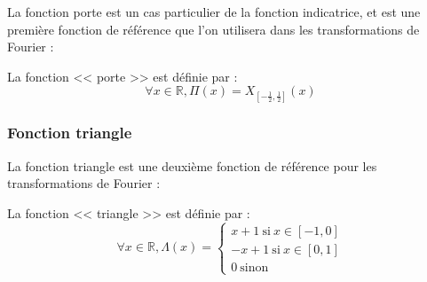 \documentclass[12pt, a4paper]{article}
\begin{document}
La fonction porte est un cas particulier de la fonction indicatrice, et est une première fonction de référence que l'on utilisera dans les transformations de Fourier :

\begin{tcolorbox}
	La fonction << porte >> est définie par :
	\begin{equation*}
		\forall x \in \mathbb{R}, \Pi(x) = X_{[-\frac{1}{2}, \frac{1}{2}]}(x)
	\end{equation*}
\end{tcolorbox}

\begin{center}
\end{center}


\clearpage


\subsubsection{Fonction triangle}

La fonction triangle est une deuxième fonction de référence pour les transformations de Fourier :

\begin{tcolorbox}
	La fonction << triangle >> est définie par :
	\begin{equation*}
		\forall x \in \mathbb{R}, \Lambda(x) =
		\begin{cases}
			x + 1 ~ \text{si} ~ x \in [-1, 0] \\
			-x + 1 ~ \text{si} ~ x \in [0, 1] \\
			0 ~ \text{sinon}
		\end{cases}
	\end{equation*}
\end{tcolorbox}

\begin{center}
\end{center}
\end{document}
